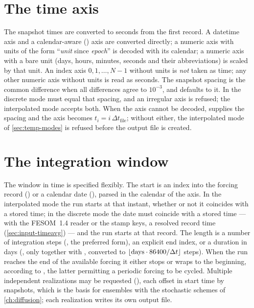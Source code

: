\section{The time axis}\label{sec:input-axis}

The snapshot times are converted to seconds from the first record. A datetime axis and a calendar-aware
() axis are converted directly; a numeric axis with units of the form ``\emph{unit} since
\emph{epoch}'' is decoded with its calendar; a numeric axis with a bare unit (days, hours, minutes, seconds
and their abbreviations) is scaled by that unit. An index axis $0,1,\dots,N-1$ without units is \emph{not}
taken as time; any other numeric axis without units is read as seconds. The snapshot spacing is the common difference when all differences agree to $10^{-3}$, and
 defaults to it. In the discrete mode  must equal that spacing, and an
irregular axis is refused; the interpolated mode accepts both. When the axis cannot be decoded,  supplies the
spacing and the axis becomes $t_i=i\,\Delta t_{\text{file}}$; without either, the interpolated mode of
\cref{sec:temp-modes} is refused before the output file is created.

\section{The integration window}\label{sec:input-window}

The window in time is specified flexibly. The start is an index into the forcing record
() or a calendar date (), parsed in the calendar of the
axis. In the interpolated mode the run starts at that instant, whether or not it coincides with a stored
time; in the discrete mode the date must coincide with a stored time --- with the FESOM~1.4 reader or the
stamp keys, a resolved record time (\cref{sec:input-timeavg}) --- and the run starts at that record. The length is a number of integration
steps (, the preferred form), an explicit end index, or a duration in days
(, only together with , converted to
$\lfloor\text{days}\cdot86400/\Delta t\rfloor$ steps). When the run reaches
the end of the available forcing it either stops or wraps to the beginning, according to
, the latter permitting a periodic forcing to be cycled. Multiple independent realizations
may be requested (), each offset in start time by  snapshots, which is the
basis for ensembles with the stochastic schemes of \cref{ch:diffusion}; each realization writes its own output
file.

